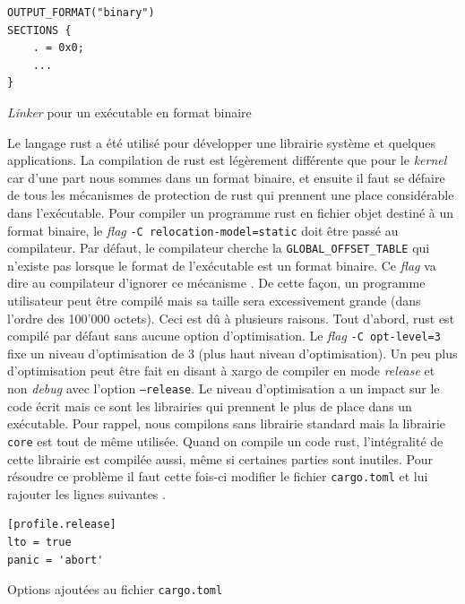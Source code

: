 \begin{code}
\begin{verbatim}
OUTPUT_FORMAT("binary")
SECTIONS {
    . = 0x0;
    ...
}
\end{verbatim}
\caption{\textit{Linker} pour un exécutable en format binaire}
\label{lst:tasks:app:linker}
\end{code} \bigbreak

Le langage rust a été utilisé pour développer une librairie système et quelques
applications. La compilation de rust est légèrement différente que pour le
\textit{kernel} car d'une part nous sommes dans un format binaire, et ensuite
il faut se défaire de tous les mécanismes de protection de rust qui prennent
une place considérable dans l'exécutable. Pour compiler un programme rust
en fichier objet destiné à un format binaire, le \textit{flag}
\texttt{-C relocation-model=static} doit être passé au compilateur.
Par défaut, le compilateur cherche la \texttt{GLOBAL_OFFSET_TABLE}
qui n'existe pas lorsque le format de l'exécutable est un format binaire.
Ce \textit{flag} va dire au compilateur d'ignorer ce mécanisme \cite{ref25}.
De cette façon, un programme utilisateur peut être compilé mais sa taille sera
excessivement grande (dans l'ordre des 100'000 octets). Ceci est dû à plusieurs
raisons. Tout d'abord, rust est compilé par défaut sans aucune option d'optimisation.
Le \textit{flag} \texttt{-C opt-level=3} fixe un niveau d'optimisation
de 3 (plus haut niveau d'optimisation). Un peu plus d'optimisation peut être
fait en disant à xargo de compiler en mode \textit{release} et non \textit{debug}
avec l'option \texttt{--release}. Le niveau d'optimisation a un impact
sur le code écrit mais ce sont les librairies qui prennent le plus de place dans
un exécutable. Pour rappel, nous compilons sans librairie standard mais la librairie
\texttt{core} est tout de même utilisée. Quand on compile un code rust,
l'intégralité de cette librairie est compilée aussi, même si certaines parties
sont inutiles. Pour résoudre ce problème il faut cette fois-ci modifier le fichier
\texttt{cargo.toml} et lui rajouter les lignes suivantes \cite{ref26}.

\begin{code}
\begin{verbatim}
[profile.release]
lto = true
panic = 'abort'
\end{verbatim}
\caption{Options ajoutées au fichier \texttt{cargo.toml}}
\label{lst:tasks:app:cargotoml}
\end{code} \bigbreak

